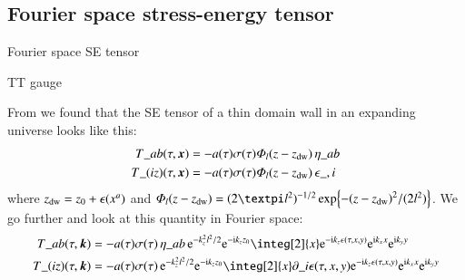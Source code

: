 \subsection{Fourier space stress-energy tensor}
    \begin{bullets}
        \item Fourier space SE tensor
        \item TT gauge
    \end{bullets}
    From  we found that the SE tensor of a thin domain wall in an expanding universe looks like this:
    \begin{equation}
        \begin{split}
            T\_{ab}(\tau, \vec{x})  &=  -a (\tau)\sigma(\tau) \varPhi_l(z-z\ped{dw}) \, \eta\_{ab} \\
            T\_{(iz)}(\tau, \vec{x})  &= -a (\tau)\sigma(\tau) \varPhi_l(z-z\ped{dw} ) \,\epsilon\_{,i} %
        \end{split}
    \end{equation}
    where $z\ped{dw} = z_0 + \epsilon(x\^a)$ and $\varPhi_l(z-z\ped{dw})= (2\ppi l^2)^{-1/2} \exp{- \pclosed{z-z\ped{dw}}^2/  (2l^2) }$. We go further and look at this quantity in Fourier space:
    \begin{equation}
        \begin{split}
            T\_{ab}(\tau, \vec{k})  &=  -a (\tau)\sigma(\tau)  \, \eta\_{ab} \,\eu[-k_z^2 l^2 / 2] \eu[-\im k_z z_0] \integ[2]{x} \eu[-\im k_z \epsilon(\tau, x, y)] \eu[\im k_x x]\eu[\im k_y y] \\
            T\_{(iz)}(\tau, \vec{k})  &= -a (\tau)\sigma(\tau) \,\eu[-k_z^2 l^2 / 2] \eu[-\im k_z z_0] \integ[2]{x} \partial\_i\epsilon(\tau, x, y)  \eu[-\im k_z \epsilon(\tau, x, y)] \eu[\im k_x x]\eu[\im k_y y]%
        \end{split}
    \end{equation}
